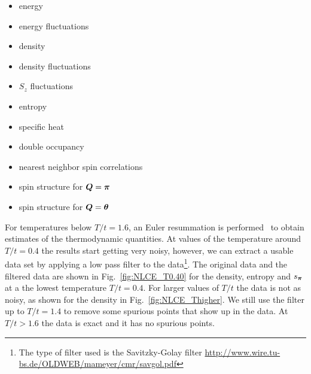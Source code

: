 \begin{multicols}{2}
\begin{itemize}
  \item energy 
  \item energy fluctuations
  \item density
  \item density fluctuations 
  \item $S_{z}$ fluctuations
  \item entropy
  \item specific heat
  \item double occupancy
  \item nearest neighbor spin correlations
  \item spin structure for $\bm{Q}=\bm{\pi}$
  \item spin structure for $\bm{Q}=\bm{\theta}$
\end{itemize}
\end{multicols}

\vspace{-1em}
For temperatures below $T/t=1.6$,  an Euler resummation is
performed~\cite{Tang2013} to obtain estimates of the thermodynamic quantities.
At values of the temperature around $T/t=0.4$ the results start getting very
noisy, however, we can extract a usable data set by applying a low pass filter
to the data\footnote{The type of filter used is the Savitzky-Golay filter
\url{http://www.wire.tu-bs.de/OLDWEB/mameyer/cmr/savgol.pdf}}.  The original
data and the filtered data are shown in Fig.~\ref{fig:NLCE_T0.40} for the
density, entropy and $s_{\bm{\pi}}$ at a the lowest temperature $T/t=0.4$.  For
larger values of $T/t$ the data is not as noisy, as shown for the density in
Fig.~\ref{fig:NLCE_Thigher}.  We still use the filter up to $T/t=1.4$ to remove
some spurious points that show up in the data.  At $T/t > 1.6$ the data is
exact and it has no spurious points.

